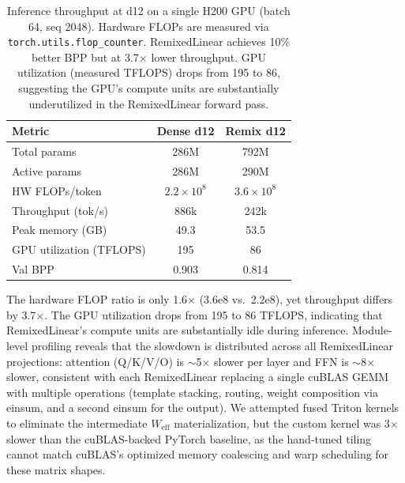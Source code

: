 \documentclass{article}
\begin{document}
\begin{table}[t]
\centering
\small
\caption{Inference throughput at d12 on a single H200 GPU (batch 64, seq 2048). Hardware FLOPs are measured via \texttt{torch.utils.flop\_counter}. RemixedLinear achieves 10\% better BPP but at 3.7$\times$ lower throughput. GPU utilization (measured TFLOPS) drops from 195 to 86, suggesting the GPU's compute units are substantially underutilized in the RemixedLinear forward pass.}
\label{tab:throughput}
\begin{tabular}{@{}lcc@{}}
\toprule
\textbf{Metric} & \textbf{Dense d12} & \textbf{Remix d12} \\
\midrule
Total params & 286M & 792M \\
Active params & 286M & 290M \\
HW FLOPs/token & $2.2 \times 10^8$ & $3.6 \times 10^8$ \\
Throughput (tok/s) & 886k & 242k \\
Peak memory (GB) & 49.3 & 53.5 \\
GPU utilization (TFLOPS) & 195 & 86 \\
Val BPP & 0.903 & 0.814 \\
\bottomrule
\end{tabular}
\end{table}

The hardware FLOP ratio is only 1.6$\times$ (3.6e8 vs.\ 2.2e8), yet throughput differs by 3.7$\times$. The GPU utilization drops from 195 to 86 TFLOPS, indicating that RemixedLinear's compute units are substantially idle during inference. Module-level profiling reveals that the slowdown is distributed across all RemixedLinear projections: attention (Q/K/V/O) is ${\sim}$5$\times$ slower per layer and FFN is ${\sim}$8$\times$ slower, consistent with each RemixedLinear replacing a single cuBLAS GEMM with multiple operations (template stacking, routing, weight composition via einsum, and a second einsum for the output). We attempted fused Triton kernels to eliminate the intermediate $W_\text{eff}$ materialization, but the custom kernel was 3$\times$ slower than the cuBLAS-backed PyTorch baseline, as the hand-tuned tiling cannot match cuBLAS's optimized memory coalescing and warp scheduling for these matrix shapes.
\end{document}
